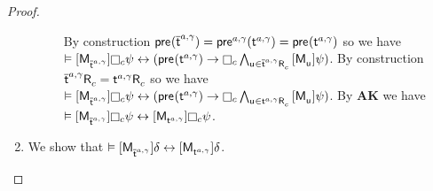 \begin{proof}
\begin{enumerate}
\begin{description}
                By construction $\aPrecondition(\aPStateT[\agentA, \gamma])= \aPrecondition[\agentA, \gamma](\aStateT[\agentA, \gamma]) = \aPrecondition(\aStateT[\agentA, \gamma])$ so we have $\entails \actionA{\aPModel{\aPStateT[\agentA, \gamma]}} \necessaryC \psi \iff (\aPrecondition(\aStateT[\agentA, \gamma]) \implies \necessaryC \bigwedge_{\aStateU \in \aSuccessorsC{\aPStateT[\agentA, \gamma]}} \actionA{\aPModel{\aStateU}} \psi)$.
                By construction $\aSuccessorsC{\aPStateT[\agentA, \gamma]} = \aSuccessorsC{\aStateT[\agentA, \gamma]}$ so we have $\entails \actionA{\aPModel{\aPStateT[\agentA, \gamma]}} \necessaryC \psi \iff (\aPrecondition(\aStateT[\agentA, \gamma]) \implies \necessaryC \bigwedge_{\aStateU \in \aSuccessorsC{\aStateT[\agentA, \gamma]}} \actionA{\aPModel{\aStateU}} \psi)$.
                By {\bf AK} we have $\entails \actionA{\aPModel{\aPStateT[\agentA, \gamma]}} \necessaryC \psi \iff \actionA{\aPModel{\aStateT[\agentA, \gamma]}} \necessaryC \psi$.
        \end{description}
    \item We show that $\entails \actionA{\aPModel{\aPStateT[\agentA, \gamma]}} \delta \iff \actionA{\aPModel{\aStateT[\agentA, \gamma]}} \delta$.


\end{enumerate}
\end{proof}
